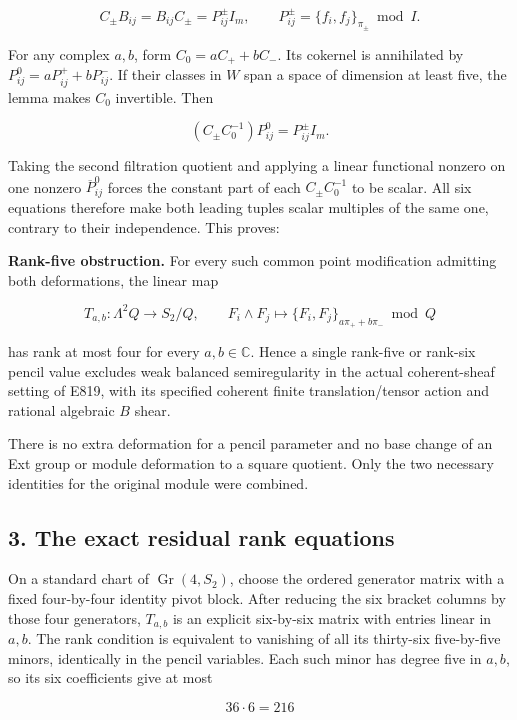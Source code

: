 \[
 C_\pm B_{ij}=B_{ij}C_\pm=P^\pm_{ij}I_m,\qquad
 P^\pm_{ij}=\{f_i,f_j\}_{\pi_\pm}\bmod I.
 \tag{E839.6}
\]

For any complex \(a,b\), form \(C_0=aC_++bC_-\). Its cokernel is
annihilated by \(P^0_{ij}=aP^+_{ij}+bP^-_{ij}\). If their classes in
\(W\) span a space of dimension at least five, the lemma makes \(C_0\)
invertible. Then

\[
 (C_\pm C_0^{-1})P^0_{ij}=P^\pm_{ij}I_m.
 \tag{E839.7}
\]

Taking the second filtration quotient and applying a linear functional
nonzero on one nonzero \(\overline P^0_{ij}\) forces the constant part
of each \(C_\pm C_0^{-1}\) to be scalar. All six equations therefore
make both leading tuples scalar multiples of the same one, contrary to
their independence. This proves:

\textbf{Rank-five obstruction.} For every such common point modification
admitting both deformations, the linear map

\[
 T_{a,b}:\Lambda^2Q\longrightarrow S_2/Q,\qquad
 F_i\wedge F_j\longmapsto
       \{F_i,F_j\}_{a\pi_++b\pi_-}\bmod Q
 \tag{E839.8}
\]

has rank at most four for every \(a,b\in\mathbb C\). Hence a single
rank-five or rank-six pencil value excludes weak balanced semiregularity
in the actual coherent-sheaf setting of E819, with its specified
coherent finite translation/tensor action and rational algebraic \(B\)
shear.

There is no extra deformation for a pencil parameter and no base change
of an Ext group or module deformation to a square quotient. Only the two
necessary identities for the original module were combined.

\subsection{3. The exact residual rank
equations}\label{the-exact-residual-rank-equations}

On a standard chart of \(\operatorname{Gr}(4,S_2)\), choose the ordered
generator matrix with a fixed four-by-four identity pivot block. After
reducing the six bracket columns by those four generators, \(T_{a,b}\)
is an explicit six-by-six matrix with entries linear in \(a,b\). The
rank condition is equivalent to vanishing of all its thirty-six
five-by-five minors, identically in the pencil variables. Each such
minor has degree five in \(a,b\), so its six coefficients give at most

\[
 36\cdot6=216
 \tag{E839.9}
\]

